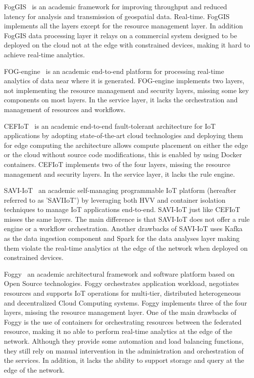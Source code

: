 FogGIS~\cite{7894725} is an academic framework for improving throughput and reduced latency for analysis and transmission of geospatial data. Real-time. FogGIS implements all the layers except for the resource management layer. In addition FogGIS data processing layer it relays on a commercial system designed to be deployed on the cloud not at the edge with constrained devices, making it hard to achieve real-time analytics. 

FOG-engine~\cite{7588914} is an academic end-to-end platform for processing real-time analytics of data near where it is generated. FOG-engine implements two layers, not implementing the resource management and security layers, missing some key components on most layers. In the service layer, it lacks the orchestration and management of resources and workflows.

CEFIoT~\cite{8355149} is an academic end-to-end fault-tolerant architecture for IoT applications by adopting state-of-the-art cloud technologies and deploying them for edge computing the architecture allows compute placement on either the edge or the cloud without source code modifications, this is enabled by using Docker containers. CEFIoT implements two of the four layers, missing the resource management and security layers. In the service layer, it lacks the rule engine.

SAVI-IoT~\cite{8114487} an academic self-managing programmable IoT platform (hereafter referred to as 'SAVIIoT') by leveraging both HVV and container isolation techniques to manage IoT applications end-to-end. SAVI-IoT just like CEFIoT misses the same layers. The main difference is that SAVI-IoT does not offer a rule engine or a workflow orchestration. Another drawbacks of SAVI-IoT uses Kafka as the data ingestion component and Spark for the data analyses layer making them violate the real-time analytics at the edge of the network when deployed on constrained devices. 

Foggy~\cite{8027267} an academic architectural framework and software platform based on Open Source technologies. Foggy orchestrates application workload, negotiates resources and supports IoT operations for multi-tier, distributed heterogeneous and decentralized Cloud Computing systems. Foggy implements three of the four layers, missing the resource management layer. One of the main drawbacks of Foggy is the use of containers for orchestrating resources between the federated resource, making it no able to perform real-time analytics at the edge of the network. Although they provide some automation and load balancing functions, they still rely on manual intervention in the administration and orchestration of the services. In addition, it lacks the ability to support storage and query at the edge of the network.

